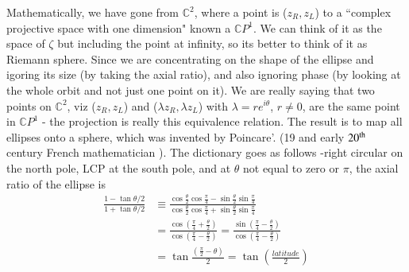 Mathematically, we have gone from $\mathbb{C}^2$, where a point is ($z_R , z_L$) to a ``complex projective space with one dimension" known a $\mathbb{C}P^1$. We can think of it
as the space of $\zeta$ but including the point at infinity, so its better to think of it
as Riemann sphere. Since we are concentrating on the shape of the ellipse and
igoring its size (by taking the axial ratio), and also ignoring phase (by looking
at the whole orbit and not just one point on it). We are really saying that two
points on $\mathbb{C}^2$, viz ($z_R , z_L$) and ($\lambda z_R , \lambda z_L$) with $\lambda = re^{i\theta}$, $r\neq 0$, are the same
point in $\mathbb{C}P^1$ - the projection is really this equivalence relation. The result is to
map all ellipses onto a sphere, which was invented by Poincare'. (19 and early
$20^{\rm th}$ century French mathematician ). The dictionary goes as follows -right circular on the north pole, LCP at the south pole, and at $\theta$ not equal to zero or
$\pi$, the axial ratio of the ellipse is
\begin{align*}
\frac{1-\tan \theta /2}{1+ \tan \theta /2} & \equiv \frac{\cos \frac{\theta}{2} \cos \frac{\pi}{4} - \sin \frac{\theta}{2} \sin \frac{\pi}{4}}{\cos \frac{\theta}{2} \cos \frac{\pi}{4} + \sin \frac{\theta}{2} \sin \frac{\pi}{4}}\\
& = \frac{\cos (\frac{\pi}{4} + \frac{\theta}{2})}{\cos (\frac{\pi}{4} - \frac{\theta}{2})} = \frac{\sin (\frac{\pi}{4} -\frac{\theta}{2})}{\cos (\frac{\pi}{4} - \frac{\theta }{2})}\\
& = \tan \frac{(\frac{\pi}{2} -\theta)}{2} = \tan \left(\frac{latitude}{2} \right)
\end{align*}

